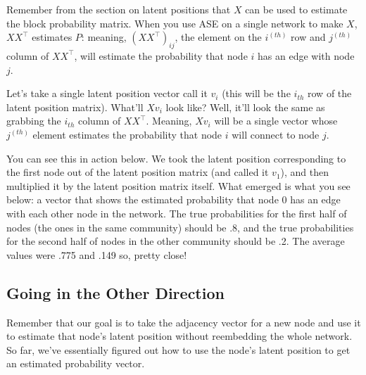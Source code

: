 \documentclass[letterpaper,10pt,english]{jupyterBook}
\begin{document}
\sphinxAtStartPar
Remember from the section on latent positions that \(X\) can be used to estimate the block probability matrix. When you use ASE on a single network to make \(X\), \(XX^\top\) estimates \(P\): meaning, \((XX^\top)_{ij}\), the element on the \(i^{(th)}\) row and \(j^{(th)}\) column of \(XX^\top\), will estimate the probability that node \(i\) has an edge with node \(j\).

\sphinxAtStartPar
Let’s take a single latent position vector \sphinxhyphen{} call it \(v_i\) (this will be the \(i_{th}\) row of the latent position matrix). What’ll \(X v_i\) look like? Well, it’ll look the same as grabbing the \(i_{th}\) column of \(XX^\top\). Meaning, \(X v_i\) will be a single vector whose \(j^{(th)}\) element estimates the probability that node \(i\) will connect to node \(j\).

\sphinxAtStartPar
You can see this in action below. We took the latent position corresponding to the first node out of the latent position matrix (and called it \(v_1\)), and then multiplied it by the latent position matrix itself. What emerged is what you see below: a vector that shows the estimated probability that node 0 has an edge with each other node in the network. The true probabilities for the first half of nodes (the ones in the same community) should be .8, and the true probabilities for the second half of nodes in the other community should be .2. The average values were .775 and .149 \sphinxhyphen{} so, pretty close!

\begin{sphinxVerbatim}[commandchars=\\\{\}]
  \PYG{p}{[} \PYG{p}{]}
    
\end{sphinxVerbatim}

\noindent{}


\subsection{Going in the Other Direction}
\label{\detokenize{applications/ch8/out-of-sample:going-in-the-other-direction}}
\sphinxAtStartPar
Remember that our goal is to take the adjacency vector for a new node and use it to estimate that node’s latent position without re\sphinxhyphen{}embedding the whole network. So far, we’ve essentially figured out how to use the node’s latent position to get an estimated probability vector.
\end{document}
